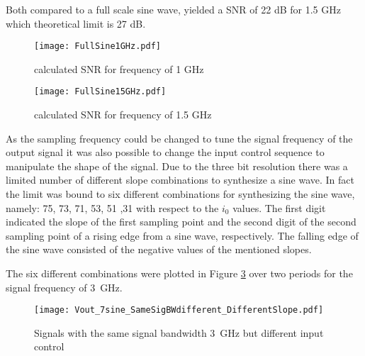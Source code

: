 Both compared to a full scale sine wave, yielded a SNR of 22 dB for 1.5 GHz which theoretical limit is 27 dB. %
\begin{figure}[htb]
	\centering
  \texttt{[image: FullSine1GHz.pdf]}
	\caption{calculated SNR for frequency of 1 GHz}
	\label{fig:SNRSine1GHz}
\end{figure}


\begin{figure}[htb]
	\centering
  \texttt{[image: FullSine15GHz.pdf]}
	\caption{calculated SNR for frequency of 1.5 GHz}
	\label{fig:SNRSine1.5GHz}
\end{figure}


As the sampling frequency could be changed to tune the signal frequency of the output signal it was also possible to change the input control sequence to manipulate the shape of the signal.
Due to the three bit resolution there was a limited number of different slope combinations to synthesize a sine wave.
In fact the limit was bound to six different combinations for synthesizing  the sine wave, namely: 75, 73, 71, 53, 51 ,31 with respect to the $i_0$ values.
The first digit indicated the slope of the first sampling point and the second digit of the second sampling point of a rising edge from a sine wave, respectively. 
The falling edge of the sine wave consisted of the negative values of the mentioned slopes.

The six different combinations were plotted in Figure \ref{fig:SameSigBWDifSlope} over two periods for the signal frequency of \SI{3}{\GHz}. 

\begin{figure}[htb!]
	\centering
  \texttt{[image: Vout\_7sine\_SameSigBWdifferent\_DifferentSlope.pdf]}
	\caption{Signals with the same signal bandwidth \SI{3}{\giga \hertz} but different input control}
	\label{fig:SameSigBWDifSlope}
\end{figure}

